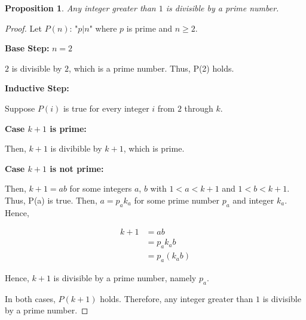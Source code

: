 \documentclass{article}
\newtheorem{proposition}{Proposition}
\begin{document}
\begin{proposition}
Any integer greater than $1$ is divisible by a prime number.
\end{proposition}

\begin{proof}
Let $P(n)$: "$p|n$" where $p$ is prime and $n \ge 2$.

\textbf{Base Step:} $n=2$

$2$ is divisible by $2$, which is a prime number. Thus,
P(2) holds.

\textbf{Inductive Step:}

Suppose $P(i)$ is true for every integer $i$ from $2$ through $k$.

\textbf{Case $k+1$ is prime:}

Then, $k+1$ is divibible by $k+1$, which is prime.

\textbf{Case $k+1$ is not prime:}

Then, $k+1=ab$ for some integers $a$, $b$ with $1<a<k+1$ and
$1<b<k+1$. Thus, P(a) is true. Then, $a=p_ak_a$ for
some prime number $p_a$ and integer $k_a$. Hence,

\begin{align*}
k+1&=ab\\
&=p_ak_ab\\
&=p_a(k_ab)
\end{align*}

Hence, $k+1$ is divisible by a prime number, namely $p_a$.

In both cases, $P(k+1)$ holds. Therefore, any integer greater than $1$
is divisible by a prime number.

\end{proof}
\end{document}
